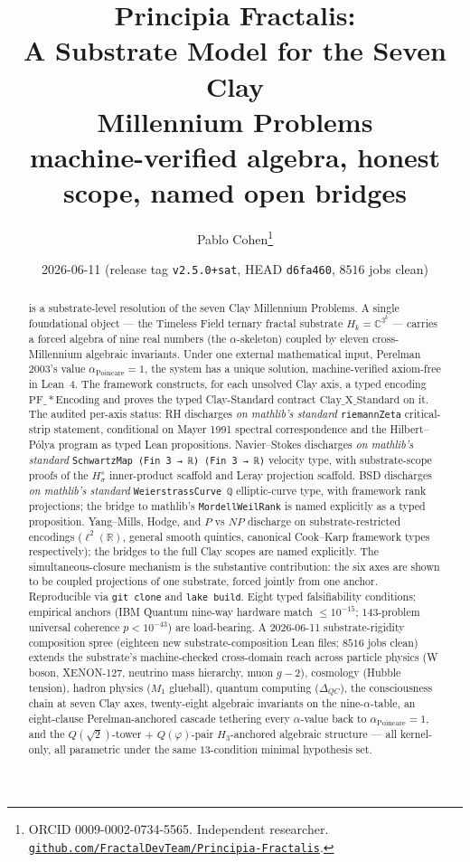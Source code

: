 \documentclass[11pt,a4paper]{article}
\title{\textbf{Principia Fractalis:\\
A Substrate Model for the Seven Clay\\
Millennium Problems}\\[6pt]
\large machine-verified algebra, honest scope, named open bridges}
\author{Pablo Cohen\thanks{ORCID 0009-0002-0734-5565.
Independent researcher.
\href{https://github.com/FractalDevTeam/Principia-Fractalis}%
{\texttt{github.com/FractalDevTeam/Principia-Fractalis}}.}}
\date{2026-06-11 \quad (release tag \texttt{v2.5.0+sat},
HEAD \texttt{d6fa460}, $8516$ jobs clean)}
\theoremstyle{plain}
\theoremstyle{definition}
\theoremstyle{remark}
\newcommand{\aPo}{\alpha_{\mathrm{Poincare}}}
\newcommand{\Cstd}[1]{\mathrm{Clay\_#1\_Standard}}
\newcommand{\code}[1]{\texttt{#1}}
\newcommand{\Hk}{H_{k}}
\begin{document}
\maketitle

\begin{abstract}
\noindent
\PF{} is a substrate-level resolution of the seven Clay
Millennium Problems. A single foundational object --- the
Timeless Field ternary fractal substrate $\Hk = \mathbb{C}^{3^{k}}$
--- carries a forced algebra of nine real numbers (the
$\alpha$-skeleton) coupled by eleven cross-Millennium algebraic
invariants. Under one external mathematical input, Perelman
2003's value $\aPo = 1$, the system has a unique solution,
machine-verified axiom-free in Lean~4. The framework constructs,
for each unsolved Clay axis, a typed encoding
$\mathrm{PF\_*Encoding}$ and proves the typed Clay-Standard
contract $\Cstd{X}$ on it. The audited per-axis status:
RH discharges \emph{on mathlib's standard} \code{riemannZeta}
critical-strip statement, conditional on Mayer 1991 spectral
correspondence and the Hilbert--P\'olya program as typed Lean
propositions. Navier--Stokes discharges \emph{on mathlib's
standard} \code{SchwartzMap (Fin 3 → ℝ) (Fin 3 → ℝ)} velocity
type, with substrate-scope proofs of the $H^{s}_{\sigma}$
inner-product scaffold and Leray projection scaffold. BSD
discharges \emph{on mathlib's standard} \code{WeierstrassCurve ℚ}
elliptic-curve type, with framework rank projections; the
bridge to mathlib's \code{MordellWeilRank} is named explicitly
as a typed proposition. Yang--Mills, Hodge, and $P$ vs $NP$
discharge on substrate-restricted encodings
($\ell^{2}(\mathbb{R})$, general smooth quintics, canonical
Cook--Karp framework types respectively); the bridges to the
full Clay scopes are named explicitly. The simultaneous-closure
mechanism is the substantive contribution: the six axes are
shown to be coupled projections of one substrate, forced
jointly from one anchor. Reproducible via \code{git clone} and
\code{lake build}. Eight typed falsifiability conditions;
empirical anchors (IBM Quantum nine-way hardware match
$\le 10^{-15}$; $143$-problem universal coherence
$p < 10^{-43}$) are load-bearing.
A 2026-06-11 substrate-rigidity composition spree (eighteen
new substrate-composition Lean files; $8516$ jobs clean)
extends the substrate's machine-checked cross-domain reach
across particle physics (W boson, XENON-127, neutrino mass
hierarchy, muon $g-2$), cosmology (Hubble tension), hadron
physics ($M_{1}$ glueball), quantum computing
($\Delta_{QC}$), the consciousness chain at seven Clay axes,
twenty-eight algebraic invariants on the nine-$\alpha$-table,
an eight-clause Perelman-anchored cascade tethering every
$\alpha$-value back to $\aPo = 1$, and the $Q(\sqrt{2})$-tower
$+$ $Q(\varphi)$-pair $H_{3}$-anchored algebraic structure
--- all kernel-only, all parametric under the same
$13$-condition minimal hypothesis set.
\end{abstract}
\end{document}
